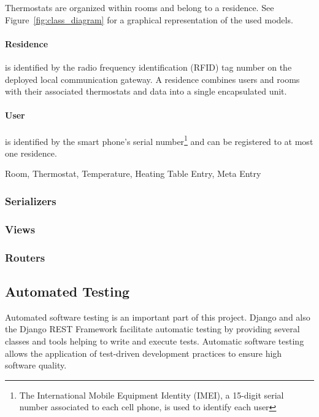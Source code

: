 Thermostats are organized within rooms and belong to a residence. See Figure~\ref{fig:class_diagram} for a graphical representation of the used models.

\paragraph{Residence}

is identified by the radio frequency identification (RFID) tag number on the deployed local communication gateway. A residence combines users and rooms with their associated thermostats and data into a single encapsulated unit.

\paragraph{User}

is identified by the smart phone's serial number\footnote{The International Mobile Equipment Identity (IMEI), a 15-digit serial number associated to each cell phone, is used to identify each user} and can be registered to at most one residence. 

Room, Thermostat, Temperature, Heating Table Entry, Meta Entry




\subsubsection{Serializers}

\subsubsection{Views}

\subsubsection{Routers}



\subsection{Automated Testing}

Automated software testing is an important part of this project. Django and also the Django REST Framework facilitate automatic testing by providing several classes and tools helping to write and execute tests. Automatic software testing allows the application of test-driven development practices to ensure high software quality.

